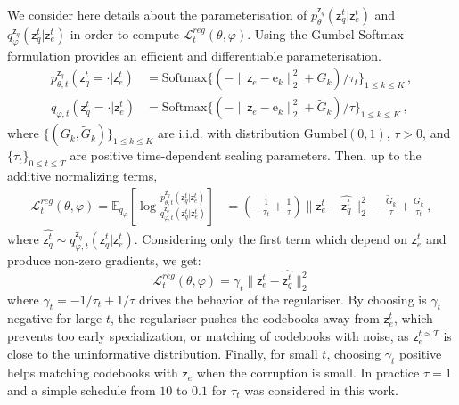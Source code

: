 \documentclass[nohyperref]{article}
\theoremstyle{plain}
\theoremstyle{definition}
\theoremstyle{remark}
\newcommand{\latentcont}{\mathsf{z}_e}
\newcommand{\latentdis}{\mathsf{z}_q}
\newcommand{\rme}{\mathrm{e}}
\newcommand{\embed}{\rme}
\begin{document}
We consider here details about the parameterisation of $p_{\theta}^{\latentdis}(\latentdis^t|\latentcont^t)$ and $q_{\varphi}^{\latentdis}(\latentdis^t|\latentcont^t)$ in order to compute $\mathcal{L}^{reg}_t(\theta,\varphi)$.
Using the Gumbel-Softmax formulation provides an efficient and differentiable parameterisation. 
\begin{align*}
p_{\theta,t}^{\latentdis}(\latentdis^t = \cdot|\latentcont^t) &= \mathrm{Softmax}\{(-\|\latentcont - \embed_k\|^2_2 + G_k )/\tau_t\}_{1\leqslant k \leqslant K}\,,\\
q_{\varphi,t}(\latentdis^t = \cdot|\latentcont^t) &= \mathrm{Softmax}\{(-\|\latentcont - \embed_k\|^2_2 + \tilde G_k )/\tau\}_{1\leqslant k \leqslant K}\,,
\end{align*}
 where $\{(G_k,\tilde G_k)\}_{1\leqslant k \leqslant K}$ are i.i.d. with distribution $\mathrm{Gumbel}(0,1)$, $\tau>0$, and $\{\tau_t\}_{0\leqslant t \leqslant T}$ are positive  time-dependent scaling parameters. Then, up to the additive normalizing terms,
\begin{align*} 
\mathcal{L}^{reg}_t(\theta,\varphi) = \mathbb{E}_{q_{\varphi}}\left[\log \frac{p_{\theta,t}^{\latentdis}(\latentdis^{t}|\latentcont^{t})}{q_{\varphi,t}^{\latentdis}(\latentdis^{t}|\latentcont^{t})}\right] &= \left(-\frac{1}{\tau_t} + \frac{1}{\tau}\right)\|\latentcont^t - \widehat{\latentdis^t}\|_2^2   - \frac{\tilde G_k}{\tau} + \frac{G_k}{\tau_t}\,,
\end{align*}
where $\widehat{\latentdis^t}\sim q_{\varphi,t}^{\latentdis}(\latentdis^{t}|\latentcont^{t})$. Considering only the first term which depend on $\latentcont^t$ and produce non-zero gradients, we get:
$$
\mathcal{L}^{reg}_t(\theta,\varphi) = \gamma_t \|\latentcont^t - \widehat{\latentdis^t}\|_2^2
$$
where $\gamma_t = -1/\tau_t + 1/\tau$ drives the behavior of the regulariser. By choosing is $\gamma_t$ negative for large $t$, the regulariser pushes the codebooks away from $\latentcont^t$, which prevents too early specialization, or matching of codebooks with noise, as $\latentcont^{t \approx T}$ is close to the uninformative distribution. Finally, for small $t$, choosing $\gamma_t$ positive helps matching codebooks with $\latentcont$ when the corruption is small. In practice $\tau=1$ and a simple schedule from $10$ to $0.1$ for $\tau_t$ was considered in this work.
\end{document}
